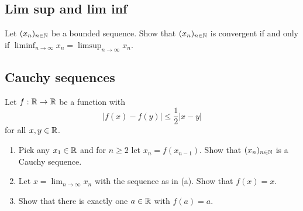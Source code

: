 \documentclass[10pt, a4paper]{article}
\newcommand{\seq}[2][x]{(#1_{#2})_{#2 \in \N}}
\begin{document}
\subsection{Lim sup and lim inf}

\begin{example}
    Let $(x_n)_{n \in \mathbb{N}}$ be a bounded sequence. Show that $(x_n)_{n \in \mathbb{N}}$ is convergent if and only if $\liminf_{n \rightarrow \infty} x_n = \limsup_{n \rightarrow \infty} x_n.$
\end{example}


\subsection{Cauchy sequences}

\begin{example}
    Let $f : \mathbb{R} \rightarrow \mathbb{R}$ be a function with
    \[
    |f(x) - f(y)| \leq \frac{1}{2}|x - y|
    \]
    for all $x, y \in \mathbb{R}$.
    \begin{enumerate}[label = \alph*.]
        \item Pick any $x_1 \in \mathbb{R}$ and for $n \geq 2$ let $x_n = f(x_{n - 1})$. Show that $\seq{n}$ is a Cauchy sequence.
        \item Let $x = \lim_{n \rightarrow \infty} x_n$ with the sequence as in (a). Show that $f(x) = x$.
        \item Show that there is exactly one $a \in \mathbb{R}$ with $f(a) = a$.
    \end{enumerate}
\end{example}
\end{document}
